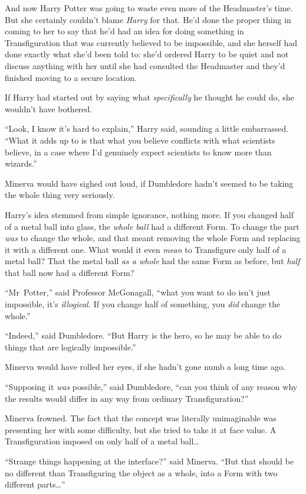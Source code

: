 And now Harry Potter was going to waste even more of the Headmaster’s time. But she certainly couldn’t blame \emph{Harry} for that. He’d done the proper thing in coming to her to say that he’d had an idea for doing something in Transfiguration that was currently believed to be impossible, and she herself had done exactly what she’d been told to: she’d ordered Harry to be quiet and not discuss anything with her until she had consulted the Headmaster and they’d finished moving to a secure location.

If Harry had started out by saying what \emph{specifically} he thought he could do, she wouldn’t have bothered.

“Look, I know it’s hard to explain,” Harry said, sounding a little embarrassed. “What it adds up to is that what you believe conflicts with what scientists believe, in a case where I’d genuinely expect scientists to know more than wizards.”

Minerva would have sighed out loud, if Dumbledore hadn’t seemed to be taking the whole thing very seriously.

Harry’s idea stemmed from simple ignorance, nothing more. If you changed half of a metal ball into glass, the \emph{whole ball} had a different Form. To change the part \emph{was} to change the whole, and that meant removing the whole Form and replacing it with a different one. What would it even \emph{mean} to Transfigure only half of a metal ball? That the metal ball \emph{as a whole} had the same Form as before, but \emph{half} that ball now had a different Form?

“Mr~Potter,” said Professor McGonagall, “what you want to do isn’t just impossible, it’s \emph{illogical.} If you change half of something, you \emph{did} change the whole.”

“Indeed,” said Dumbledore. “But Harry is the hero, so he may be able to do things that are logically impossible.”

Minerva would have rolled her eyes, if she hadn’t gone numb a long time ago.

“Supposing it \emph{was} possible,” said Dumbledore, “can you think of any reason why the results would differ in any way from ordinary Transfiguration?”

Minerva frowned. The fact that the concept was literally unimaginable was presenting her with some difficulty, but she tried to take it at face value. A Transfiguration imposed on only half of a metal ball…

“Strange things happening at the interface?” said Minerva. “But that should be no different than Transfiguring the object as a whole, into a Form with two different parts…”

